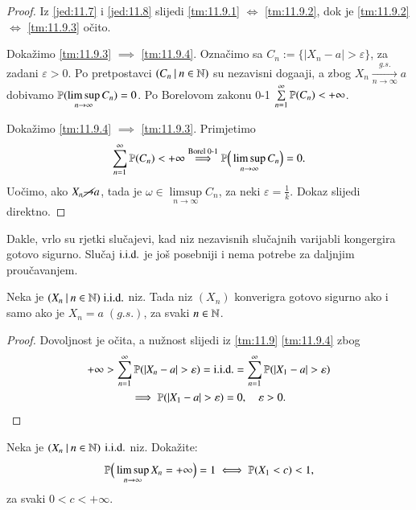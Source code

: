 \begin{proof}
    Iz \eqref{jed:11.7} i \eqref{jed:11.8} slijedi \ref{tm:11.9.1} $\iff$ \ref{tm:11.9.2}, dok je \ref{tm:11.9.2} $\iff$ \ref{tm:11.9.3} o\v cito.

    Doka\v zimo \ref{tm:11.9.3} $\implies$ \ref{tm:11.9.4}.
    Ozna\v cimo sa $C_n := \{ |X_n - a| > \varepsilon\}$, za zadani $\varepsilon > 0$.
    Po pretpostavci $({C_n} \: | \: {n \in \mathbb{N}})$ su nezavisni doga\dj aji, a zbog $X_n \xrightarrow[n \to \infty]{g.s.} a$ dobivamo $\mathbb{P}({\limsup\limits_{n \to \infty} C_n}) = 0$.
    Po Borelovom zakonu 0-1 $\sum\limits_{n = 1}^{\infty} \mathbb{P}({C_n}) < +\infty$.

    Doka\v zimo \ref{tm:11.9.4} $\implies$ \ref{tm:11.9.3}.
    Primjetimo
    \begin{equation*}
        \sum\limits_{n = 1}^{\infty} \mathbb{P}({C_n}) < +\infty \overset{\textnormal{Borel 0-1}}{\implies} \mathbb{P} \Big( \limsup\limits_{n \to \infty} C_n \Big) = 0.
    \end{equation*}
    Uo\v cimo, ako $X_n \cancel{\to} a$, tada je $\omega \in \limsup\limits_{n \to \infty} C_n$, za neki $\varepsilon = \frac{1}{k}$.
    Dokaz slijedi direktno.
\end{proof}

Dakle, vrlo su rjetki slu\v cajevi, kad niz nezavisnih slu\v cajnih varijabli kongergira gotovo sigurno.
Slu\v caj $\mathrm{i.i.d.}$ je jo\v s posebniji i nema potrebe za daljnjim prou\v cavanjem.

\begin{kor} \label{kor:11.10}
    Neka je $({X_n} \: | \: {n \in \mathbb{N}}) \; \mathrm{i.i.d.}$ niz.
    Tada niz $(X_n)$ konverigra gotovo sigurno ako i samo ako je $X_n = a \; (g.s.)$, za svaki $n \in \mathbb{N}$.
\end{kor}

\begin{proof}
    Dovoljnost je o\v cita, a nu\v znost slijedi iz \ref{tm:11.9} \ref{tm:11.9.4} zbog
    \begin{equation*}
        \begin{gathered}
            +\infty > \suma{n = 1}{\infty} \vjeroj{|X_n - a|>\varepsilon} = \iid = \suma{n = 1}{\infty} \vjeroj{|X_1 - a|> \varepsilon}\\
            \implies \vjeroj{|X_1 - a| > \varepsilon} = 0, \quad \varepsilon > 0.
        \end{gathered}
    \end{equation*}
\end{proof}

\begin{zad} \label{zad:11.11}
    Neka je $({X_n} \: | \: {n \in \mathbb{N}})$ $\mathrm{i.i.d.}$ niz.
    Doka\v zite:
    \begin{equation*}
        \mathbb{P} \Big( \limsup\limits_{n \to \infty} X_n  = +\infty \Big) = 1 \iff \mathbb{P}({X_1 < c}) < 1,
    \end{equation*}
    za svaki $0 < c < +\infty$.
\end{zad}

